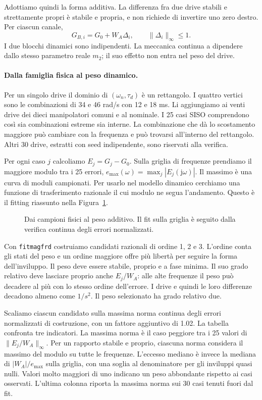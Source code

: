 Adottiamo quindi la forma additiva. La differenza fra due drive stabili e strettamente propri è stabile e propria, e non richiede di invertire uno zero destro. Per ciascun canale,
\[
 G_{B,i}=G_0+W_A\Delta_i,\qquad \|\Delta_i\|_\infty\leq1.
\]
I due blocchi dinamici sono indipendenti. La meccanica continua a dipendere dallo stesso parametro reale $m_2$; il suo effetto non entra nel peso del drive.


\paragraph*{Dalla famiglia fisica al peso dinamico.}
Per un singolo drive il dominio di $(\omega_n,\tau_d)$ è un rettangolo.
I quattro vertici sono le combinazioni di 34 e 46 rad/s con 12 e
18 ms. Li aggiungiamo ai venti drive dei dieci manipolatori comuni
e al nominale. I 25 casi SISO comprendono così sia combinazioni
estreme sia interne. La combinazione che dà lo scostamento
maggiore può cambiare con la frequenza e può trovarsi all'interno
del rettangolo. Altri 30 drive, estratti con seed indipendente,
sono riservati alla verifica.

Per ogni caso $j$ calcoliamo $E_j=G_j-G_0$. Sulla griglia di
frequenze prendiamo il maggiore modulo tra i 25 errori,
$e_{\max}(\omega)=\max_j|E_j(\mathrm{j}\omega)|$. Il massimo è una
curva di moduli campionati. Per usarlo nel modello dinamico
cerchiamo una funzione di trasferimento razionale il cui modulo
ne segua l'andamento. Questo è il fitting riassunto nella
Figura~\ref{fig:fit-drive}.

\begin{figure}[!htbp]\centering
\resizebox{.88\linewidth}{!}{}
\caption{Dai campioni fisici al peso additivo. Il fit sulla griglia
è seguito dalla verifica continua degli errori normalizzati.}
\label{fig:fit-drive}
\end{figure}

Con \texttt{fitmagfrd} costruiamo candidati razionali di ordine 1, 2 e 3.
L'ordine conta gli stati del peso e un ordine maggiore offre più
libertà per seguire la forma dell'inviluppo. Il peso deve essere
stabile, proprio e a fase minima. Il suo grado relativo deve lasciare
proprio anche $E_j/W_A$: alle alte frequenze il peso può decadere
al più con lo stesso ordine dell'errore. I drive e quindi le loro
differenze decadono almeno come $1/s^2$. Il peso selezionato ha
grado relativo due.

Scaliamo ciascun candidato sulla massima norma continua degli errori
normalizzati di costruzione, con un fattore aggiuntivo di 1.02.
La tabella confronta tre indicatori. La massima norma è il caso
peggiore tra i 25 valori di $\|E_j/W_A\|_\infty$. Per un rapporto
stabile e proprio, ciascuna norma considera il massimo del modulo
su tutte le frequenze. L'eccesso mediano è invece la mediana di
$|W_A|/e_{\max}$ sulla griglia, con una soglia al denominatore
per gli inviluppi quasi nulli. Valori molto maggiori di uno
indicano un peso abbondante rispetto ai casi osservati. L'ultima
colonna riporta la massima norma sui 30 casi tenuti fuori dal fit.

